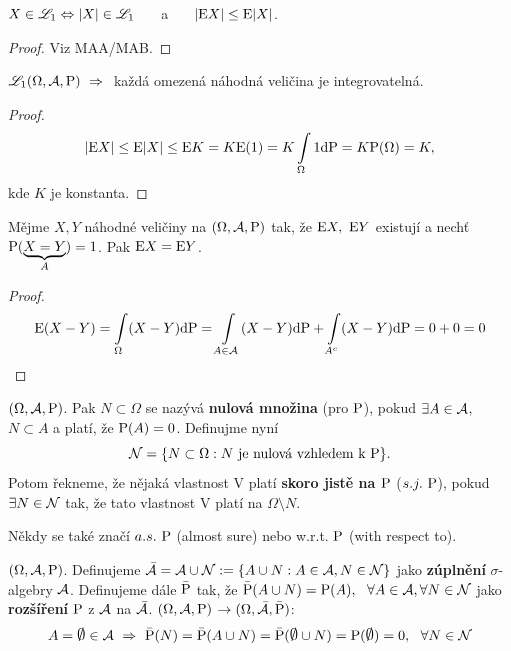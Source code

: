 \begin{theorem}
	$X\in\mathscr{L}_1 \Leftrightarrow |X|\in\mathscr{L}_1$ ~~~a~~~ $|\mathrm{E} X|\leq \mathrm{E} |X|$.
	\begin{proof}
		Viz MAA/MAB.
	\end{proof}
\end{theorem}
\begin{dusl}
	$\mathscr{L}_1(\Omega,\mathcal{A},\mathrm{P})~\Rightarrow~$ každá omezená náhodná veličina je integrovatelná.\begin{proof}
		$$ |\mathrm{E} X|\leq \mathrm{E} |X|\leq \mathrm{E} K=K\mathrm{E} (1)=K\int\limits_{\Omega}1\mathrm{d} \mathrm{P}=K \mathrm{P}(\Omega)=K, $$ kde $K$ je konstanta.
	\end{proof}
\end{dusl}
\begin{theorem}
	Mějme $X,Y$ náhodné veličiny na $(\Omega,\mathcal{A},\mathrm{P})$ tak, že $\mathrm{E} X,~\mathrm{E} Y$ existují a nechť $\mathrm{P}(\underbrace{X=Y}_{A})=1$. Pak $\mathrm{E} X=\mathrm{E} Y$.
	\begin{proof}
		$$\mathrm{E} (X-Y)=\int\limits_{\Omega}(X-Y)\mathrm{d} \mathrm{P}=\int\limits_{A\in\mathcal{A}}(X-Y)\mathrm{d} \mathrm{P}+\int\limits_{A^c}(X-Y)\mathrm{d} \mathrm{P}=0+0=0$$
	\end{proof}
\end{theorem}
\begin{define}
	$(\Omega,\mathcal{A},\mathrm{P})$. Pak $N\subset \Omega$ se nazývá \textbf{nulová množina} (pro $\mathrm{P}$), pokud $\exists A\in\mathcal{A}$, $N\subset A$ a platí, že $\mathrm{P}(A)=0$. Definujme nyní 
	$$ \mathcal{N}= \{ N \subset \Omega: N\text{ je nulová vzhledem k }\mathrm{P} \}. $$ Potom řekneme, že nějaká vlastnost V platí \textbf{skoro jistě na $\mathrm{P}$} ($s.j.~\mathrm{P}$), pokud $\exists N\in\mathcal{N}$ tak, že tato vlastnost V platí na $\Omega \setminus N.$ 
\end{define}
\begin{remark}
	Někdy se také značí $a.s.~\mathrm{P}$ (almost sure) nebo w.r.t. $\mathrm{P}$ (with respect to).
\end{remark}
\begin{define}
	$(\Omega,\mathcal{A},\mathrm{P})$. Definujeme $\bar{\mathcal{A}}=\mathcal{A}\cup\mathcal{N} :=\{ A\cup N:A\in\mathcal{A},N\in\mathcal{N} \}$ jako \textbf{zúplnění} $\sigma$-algebry $\mathcal{A}$. \newline Definujeme dále $\bar{\mathrm{P}}$ tak, že $\bar{\mathrm{P}}(A\cup N)=\mathrm{P}(A),~~\forall A\in\mathcal{A},\forall N\in\mathcal{N}$ jako \textbf{rozšíření} $\mathrm{P}$ z $\mathcal{A}$ na $\bar{\mathcal{A}}$.\newline
	$(\Omega,\mathcal{A},\mathrm{P})$ $\to (\Omega,\bar{\mathcal{A}},\bar{\mathrm{P}})$: 
	$$ A=\emptyset\in\Aa ~\Rightarrow~ \bar{\PP}(N)=\bar{\PP}(A\cup N)=\bar{\PP}(\emptyset\cup N)=\PP(\emptyset)=0,~~\forall N\in\Nn $$
\end{define}
